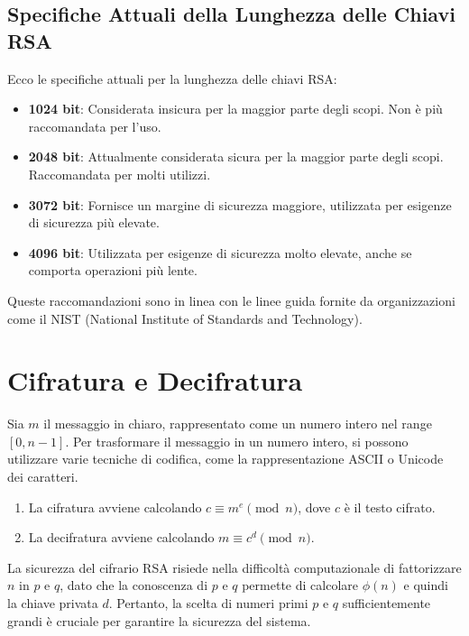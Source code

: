 \documentclass[a4paper,12pt]{report}
\begin{document}
\subsection*{Specifiche Attuali della Lunghezza delle Chiavi RSA}

Ecco le specifiche attuali per la lunghezza delle chiavi RSA:

\begin{itemize}
    \item \textbf{1024 bit}: Considerata insicura per la maggior parte degli scopi. Non è più raccomandata per l'uso.
    \item \textbf{2048 bit}: Attualmente considerata sicura per la maggior parte degli scopi. Raccomandata per molti utilizzi.
    \item \textbf{3072 bit}: Fornisce un margine di sicurezza maggiore, utilizzata per esigenze di sicurezza più elevate.
    \item \textbf{4096 bit}: Utilizzata per esigenze di sicurezza molto elevate, anche se comporta operazioni più lente.
\end{itemize}

Queste raccomandazioni sono in linea con le linee guida fornite da organizzazioni come il NIST (National Institute of Standards and Technology)\cite{nist}.

\section{Cifratura e Decifratura}
Sia $m$ il messaggio in chiaro, rappresentato come un numero intero nel range $[0, n - 1]$. Per trasformare il messaggio in un numero intero, si possono utilizzare varie tecniche di codifica, come la rappresentazione ASCII o Unicode dei caratteri.

\begin{enumerate}
    \item La cifratura avviene calcolando $c \equiv m^e \pmod{n}$, dove $c$ è il testo cifrato.
    \item La decifratura avviene calcolando $m \equiv c^d \pmod{n}$.
\end{enumerate}

La sicurezza del cifrario RSA risiede nella difficoltà computazionale di fattorizzare $n$ in $p$ e $q$, dato che la conoscenza di $p$ e $q$ permette di calcolare $\phi(n)$ e quindi la chiave privata $d$. Pertanto, la scelta di numeri primi $p$ e $q$ sufficientemente grandi è cruciale per garantire la sicurezza del sistema.
\end{document}
